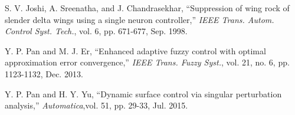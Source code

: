 \documentclass[conference]{IEEEtran}
\begin{document}
\begin{thebibliography}{99}
 S. V. Joshi, A. Sreenatha, and J. Chandrasekhar, ``Suppression of wing rock of slender delta wings using a single neuron controller,'' \textit{IEEE Trans. Autom. Control Syst. Tech.}, vol. 6, pp. 671-677, Sep. 1998.

 Y. P. Pan and M. J. Er, ``Enhanced adaptive fuzzy control with optimal approximation error convergence,'' \textit{IEEE Trans. Fuzzy Syst.}, vol. 21, no. 6, pp. 1123-1132, Dec. 2013.

 Y. P. Pan and H. Y. Yu, ``Dynamic surface control via singular pertu\-rbation analysis,'' \textit{Automatica},vol. 51, pp. 29-33, Jul. 2015.





\end{thebibliography}
\end{document}
